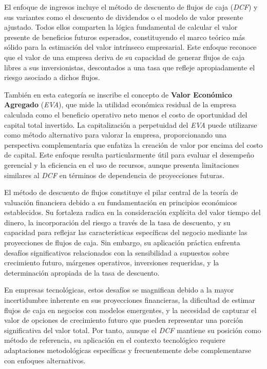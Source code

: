 El enfoque de ingresos incluye el método de descuento de flujos de caja (\emph{DCF}) y sus variantes como el descuento de dividendos o el modelo de valor presente ajustado. Todos ellos comparten la lógica fundamental de calcular el valor presente de beneficios futuros esperados, constituyendo el marco teórico más sólido para la estimación del valor intrínseco empresarial. Este enfoque reconoce que el valor de una empresa deriva de su capacidad de generar flujos de caja libres a sus inversionistas, descontados a una tasa que refleje apropiadamente el riesgo asociado a dichos flujos.

También en esta categoría se inscribe el concepto de \textbf{Valor Económico Agregado} (\emph{EVA}), que mide la utilidad económica residual de la empresa calculada como el beneficio operativo neto menos el costo de oportunidad del capital total invertido. La capitalización a perpetuidad del \emph{EVA} puede utilizarse como método alternativo para valorar la empresa, proporcionando una perspectiva complementaria que enfatiza la creación de valor por encima del costo de capital. Este enfoque resulta particularmente útil para evaluar el desempeño gerencial y la eficiencia en el uso de recursos, aunque presenta limitaciones similares al \emph{DCF} en términos de dependencia de proyecciones futuras.

El método de descuento de flujos constituye el pilar central de la teoría de valuación financiera debido a su fundamentación en principios económicos establecidos. Su fortaleza radica en la consideración explícita del valor tiempo del dinero, la incorporación del riesgo a través de la tasa de descuento, y su capacidad para reflejar las características específicas del negocio mediante las proyecciones de flujos de caja. Sin embargo, su aplicación práctica enfrenta desafíos significativos relacionados con la sensibilidad a supuestos sobre crecimiento futuro, márgenes operativos, inversiones requeridas, y la determinación apropiada de la tasa de descuento.

En empresas tecnológicas, estos desafíos se magnifican debido a la mayor incertidumbre inherente en sus proyecciones financieras, la dificultad de estimar flujos de caja en negocios con modelos emergentes, y la necesidad de capturar el valor de opciones de crecimiento futuro que pueden representar una porción significativa del valor total. Por tanto, aunque el \emph{DCF} mantiene su posición como método de referencia, su aplicación en el contexto tecnológico requiere adaptaciones metodológicas específicas y frecuentemente debe complementarse con enfoques alternativos.

